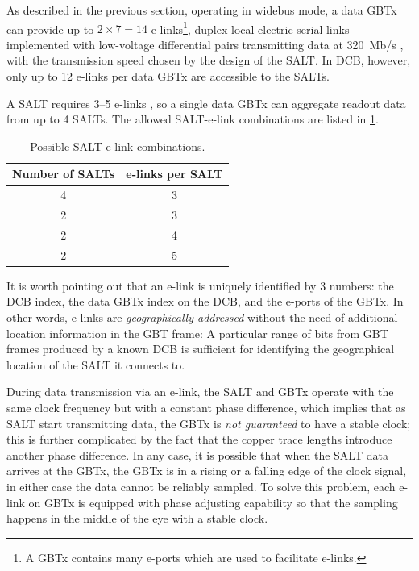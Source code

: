 As described in the previous section,
operating in widebus mode,
a data GBTx can provide up to $2 \times 7 = 14$ e-links\footnote{
    A GBTx contains many e-ports which are used to facilitate e-links.
},
duplex local electric serial links implemented with low-voltage differential
pairs transmitting data at 320~Mb/s
\cite{gbtx_manual},
with the transmission speed chosen by the design of the SALT.
In DCB, however, only up to 12 e-links per data GBTx are accessible to the
SALTs.

A SALT requires 3--5 e-links \cite{s22010107},
so a single data GBTx can aggregate readout data from up to 4 SALTs.
The allowed SALT-e-link combinations are listed in \cref{tab:salt-elink}.

\begin{table}[!htb]
    \centering
    \begin{tabular}{ c | c }
        \toprule
        \textbf{Number of SALTs} & \textbf{e-links per SALT} \\
        \midrule
        4  &  3  \\
        2  &  3  \\
        2  &  4  \\
        2  &  5  \\
        \bottomrule
    \end{tabular}

    \caption{Possible SALT-e-link combinations.}
    \label{tab:salt-elink}
\end{table}

It is worth pointing out that an e-link is uniquely identified by 3 numbers:
the DCB index, the data GBTx index on the DCB, and the e-ports of the GBTx.
In other words, e-links are \emph{geographically addressed} without the need
of additional location information in the GBT frame:
A particular range of bits from GBT frames produced by a known DCB is sufficient
for identifying the geographical location of the SALT it connects to.

During data transmission via an e-link, the SALT and GBTx operate with the same
clock frequency but with a constant phase difference,
which implies that as SALT start transmitting data,
the GBTx is \emph{not guaranteed} to have a stable clock;
this is further complicated by the fact that the copper trace lengths introduce
another phase difference.
In any case, it is possible that when the SALT data arrives at the GBTx,
the GBTx is in a rising or a falling edge of the clock signal, in either case
the data cannot be reliably sampled.
To solve this problem, each e-link on GBTx is equipped with phase adjusting
capability so that the sampling happens in the middle of the eye with a stable
clock.


